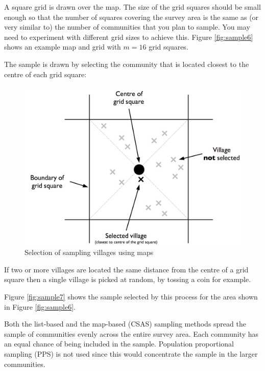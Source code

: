 \documentclass[12pt,]{book}
\theoremstyle{definition}
\theoremstyle{definition}
\theoremstyle{definition}
\theoremstyle{remark}
\begin{document}
A square grid is drawn over the map. The size of the grid squares should
be small enough so that the number of squares covering the survey area
is the same as (or very similar to) the number of communities that you
plan to sample. You may need to experiment with different grid sizes to
achieve this. Figure \ref{fig:sample6} shows an example map and grid
with \(m = 16\) grid squares.

The sample is drawn by selecting the community that is located closest
to the centre of each grid square:

\begin{figure}[h]

{\centering \includegraphics[width=16.67in]{figures/mapSample1} 

}

\caption{Selection of sampling villages using maps}\label{fig:sample5}
\end{figure}

If two or more villages are located the same distance from the centre of
a grid square then a single village is picked at random, by tossing a
coin for example.

Figure \ref{fig:sample7} shows the sample selected by this process for
the area shown in Figure \ref{fig:sample6}.

Both the list-based and the map-based (CSAS) sampling methods spread the
sample of communities evenly across the entire survey area. Each
community has an equal chance of being included in the sample.
Population proportional sampling (PPS) is not used since this would
concentrate the sample in the larger communities.
\end{document}

